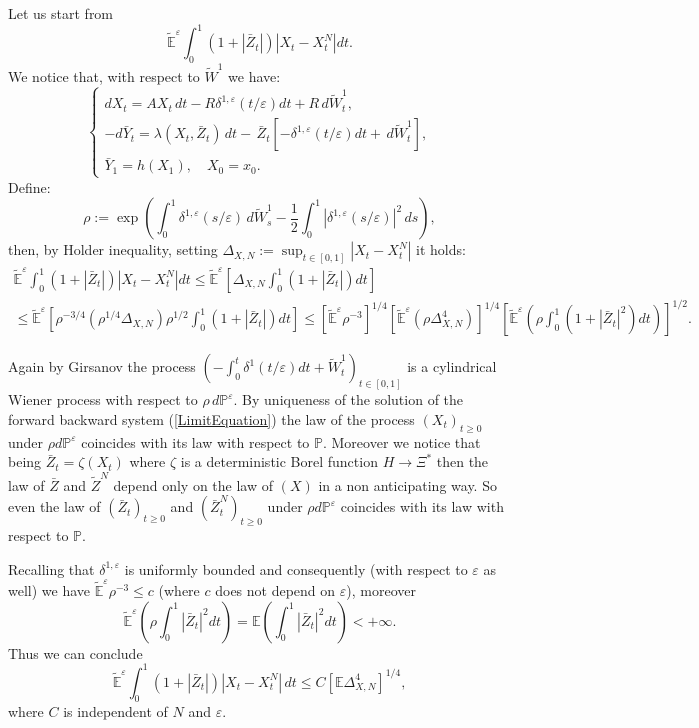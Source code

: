 \documentclass[reqno,a4paper,11 pt]{article}
\def \E {\mathbb{E}}
\def \e {\varepsilon}
\numberwithin{equation}{section}
\begin{document}
Let us start from 
 $$\widetilde{\E}^\e \int_0^{1}  (1+|\bar{Z}_t|)|{X}_{ t}-{X}^N_t|dt.$$
 We notice that, with respect to $\widetilde{W}^1$ we have:
 \begin{equation*}
\begin{cases}
d X_t =   AX_t \, dt - R \delta^{1,\e}({t}/{\e})dt + R\, d \widetilde{W}^1 _t, \\
-d\bar{Y}_t  = \lambda({X}_t,\bar{Z}_t)\,dt - \, \bar{Z}_t[- \delta^{1,\e}({t}/{\e})dt+\, d\widetilde{W}^1_t],   \\
\bar{Y}_1= h(X_1), \quad X_0= x_0.
\end{cases} 
\end{equation*}
Define: $$\rho:=\exp\left( \int_0^1 \delta^{1,\e}(s/\e) \, d \widetilde{W}_s^{1}  - \frac{1}{2} \int_0^1 | \delta^{1,\e}(s/\e) |^2 \, ds \right),$$
then, by Holder inequality, setting $\Delta_{X,N}:=
\sup_{t\in [0,1]}|{X}_{ t}-{X}^N_t|$ it holds:
\begin{align*}
\widetilde{\E}^\e \int_0^{1} (1+|\bar{Z}_t|) |{X}_{ t}-{X}^N_t|dt\leq \widetilde{\E}^\e\left[ \Delta_{X,N} \int_0^{1} (1+|\bar{Z}_t|) dt \right] \qquad\qquad\qquad\qquad \qquad\qquad \\\leq
\nonumber\widetilde{\E}^\e\left[ \rho^{-3/4}( \rho^{1/4}\Delta_{X,N}) \rho^{1/2}\!\!\!\int_0^{1}(1+|\bar{Z}_t|)dt\right]
\leq
\left[ \widetilde{\E}^\e \rho^{-3}\right]^{1/4} \left[ \widetilde{\E}^\e (\rho  \Delta_{X,N}^4)\right]^{1/4}\left[ \widetilde{\E}^\e \left(\!\rho\! \int_0^1\! (1+|\bar{Z}_t|^2 )dt\right) \right]^{1/2}.
\end{align*}

Again by Girsanov the process
$\left(-\int_0^t \delta^1(t/\e) dt+ \widetilde{ W}^1_t\right)_{t\in [0,1]}$ is a cylindrical Wiener process with respect to $\rho\, d\mathbb{P}^{\e}$. By uniqueness of the solution of the forward backward system (\ref{LimitEquation}) the law of the process $(X_t)_{t\geq 0}$  under $\rho d\mathbb{P}^{\e}$  coincides with its law with respect to $\mathbb{P}$.  Moreover  we notice that being $\bar{Z}_t= \zeta (X_t)$ where $\zeta$ is a deterministic Borel function $H\rightarrow \Xi^*$ then the law of $\bar{Z}$ and $\tilde{Z}^N$ depend only on the law of $(X)$ in a non anticipating way.  So even the law of $(\bar{Z}_t)_{t\geq 0}$ and  $(\bar{Z}^N_t)_{t\geq 0}$ under $\rho d\mathbb{P}^{\e}$  coincides with its law with respect to $\mathbb{P}$. 

Recalling that $\delta^{1,\e}$ is uniformly bounded and consequently (with respect to $\e$ as well) we have $\widetilde{\E}^\e \rho^{-3}\leq c$ (where $c$ does not depend on $\e$), moreover   
$$\widetilde{\E}^\e\left(\rho\int_0^1 |\bar{Z}_t|^2 dt \right)={\E}\left(\int_0^1 |\bar{Z}_t|^2 dt \right)<+\infty.
$$
Thus we can conclude
\begin{equation} \label{stimaZNX}\widetilde{\E}^\e \int_0^{1} (1+|\bar{Z}_t|) |{X}_{ t}-{X}^N_t|\, dt\leq
C[\E \Delta_{X,N}^4]^{1/4},
\end{equation}
where $C$ is independent of $N$ and $\e$. 
\end{document}
